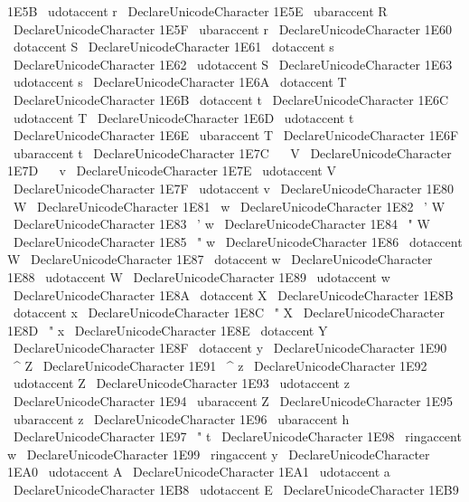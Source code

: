{{{{{{1E5B
}
{
\
udotaccent
{
r
}
}
%
\
DeclareUnicodeCharacter
{
1E5E
}
{
\
ubaraccent
{
R
}
}
%
\
DeclareUnicodeCharacter
{
1E5F
}
{
\
ubaraccent
{
r
}
}
%
%
\
DeclareUnicodeCharacter
{
1E60
}
{
\
dotaccent
{
S
}
}
%
\
DeclareUnicodeCharacter
{
1E61
}
{
\
dotaccent
{
s
}
}
%
\
DeclareUnicodeCharacter
{
1E62
}
{
\
udotaccent
{
S
}
}
%
\
DeclareUnicodeCharacter
{
1E63
}
{
\
udotaccent
{
s
}
}
%
\
DeclareUnicodeCharacter
{
1E6A
}
{
\
dotaccent
{
T
}
}
%
\
DeclareUnicodeCharacter
{
1E6B
}
{
\
dotaccent
{
t
}
}
%
\
DeclareUnicodeCharacter
{
1E6C
}
{
\
udotaccent
{
T
}
}
%
\
DeclareUnicodeCharacter
{
1E6D
}
{
\
udotaccent
{
t
}
}
%
\
DeclareUnicodeCharacter
{
1E6E
}
{
\
ubaraccent
{
T
}
}
%
\
DeclareUnicodeCharacter
{
1E6F
}
{
\
ubaraccent
{
t
}
}
%
%
\
DeclareUnicodeCharacter
{
1E7C
}
{
\
~
V
}
%
\
DeclareUnicodeCharacter
{
1E7D
}
{
\
~
v
}
%
\
DeclareUnicodeCharacter
{
1E7E
}
{
\
udotaccent
{
V
}
}
%
\
DeclareUnicodeCharacter
{
1E7F
}
{
\
udotaccent
{
v
}
}
%
%
\
DeclareUnicodeCharacter
{
1E80
}
{
\
W
}
%
\
DeclareUnicodeCharacter
{
1E81
}
{
\
w
}
%
\
DeclareUnicodeCharacter
{
1E82
}
{
\
'
W
}
%
\
DeclareUnicodeCharacter
{
1E83
}
{
\
'
w
}
%
\
DeclareUnicodeCharacter
{
1E84
}
{
\
"
W
}
%
\
DeclareUnicodeCharacter
{
1E85
}
{
\
"
w
}
%
\
DeclareUnicodeCharacter
{
1E86
}
{
\
dotaccent
{
W
}
}
%
\
DeclareUnicodeCharacter
{
1E87
}
{
\
dotaccent
{
w
}
}
%
\
DeclareUnicodeCharacter
{
1E88
}
{
\
udotaccent
{
W
}
}
%
\
DeclareUnicodeCharacter
{
1E89
}
{
\
udotaccent
{
w
}
}
%
\
DeclareUnicodeCharacter
{
1E8A
}
{
\
dotaccent
{
X
}
}
%
\
DeclareUnicodeCharacter
{
1E8B
}
{
\
dotaccent
{
x
}
}
%
\
DeclareUnicodeCharacter
{
1E8C
}
{
\
"
X
}
%
\
DeclareUnicodeCharacter
{
1E8D
}
{
\
"
x
}
%
\
DeclareUnicodeCharacter
{
1E8E
}
{
\
dotaccent
{
Y
}
}
%
\
DeclareUnicodeCharacter
{
1E8F
}
{
\
dotaccent
{
y
}
}
%
%
\
DeclareUnicodeCharacter
{
1E90
}
{
\
^
Z
}
%
\
DeclareUnicodeCharacter
{
1E91
}
{
\
^
z
}
%
\
DeclareUnicodeCharacter
{
1E92
}
{
\
udotaccent
{
Z
}
}
%
\
DeclareUnicodeCharacter
{
1E93
}
{
\
udotaccent
{
z
}
}
%
\
DeclareUnicodeCharacter
{
1E94
}
{
\
ubaraccent
{
Z
}
}
%
\
DeclareUnicodeCharacter
{
1E95
}
{
\
ubaraccent
{
z
}
}
%
\
DeclareUnicodeCharacter
{
1E96
}
{
\
ubaraccent
{
h
}
}
%
\
DeclareUnicodeCharacter
{
1E97
}
{
\
"
t
}
%
\
DeclareUnicodeCharacter
{
1E98
}
{
\
ringaccent
{
w
}
}
%
\
DeclareUnicodeCharacter
{
1E99
}
{
\
ringaccent
{
y
}
}
%
%
\
DeclareUnicodeCharacter
{
1EA0
}
{
\
udotaccent
{
A
}
}
%
\
DeclareUnicodeCharacter
{
1EA1
}
{
\
udotaccent
{
a
}
}
%
%
\
DeclareUnicodeCharacter
{
1EB8
}
{
\
udotaccent
{
E
}
}
%
\
DeclareUnicodeCharacter
{
1EB9
}
{
\
}}}}}}
